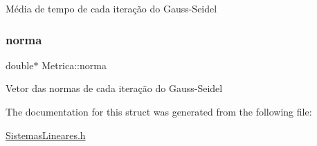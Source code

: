 Média de tempo de cada iteração do Gauss-\/\+Seidel \mbox{\label{structMetrica_a213ed1c24b4afdc96ce9c91f9a6c6301}} 
\subsubsection{\texorpdfstring{norma}{norma}}
{\footnotesize\ttfamily double$\ast$ Metrica\+::norma}

Vetor das normas de cada iteração do Gauss-\/\+Seidel 

The documentation for this struct was generated from the following file\+:\begin{DoxyCompactItemize}
\item 
\hyperlink{SistemasLineares_8h}{Sistemas\+Lineares.\+h}\end{DoxyCompactItemize}
